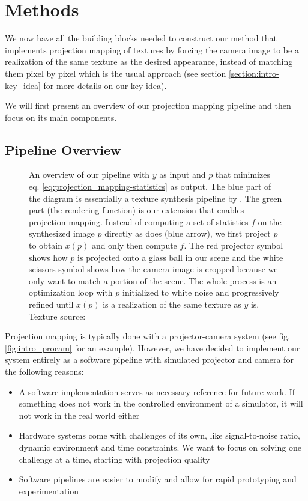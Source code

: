 \chapter{Methods}
\label{chapter:methods}

We now have all the building blocks needed to construct our method that implements projection mapping of textures by forcing the camera image to be a realization of the same texture as the desired appearance, instead of matching them pixel by pixel which is the usual approach (see section \ref{section:intro-key_idea} for more details on our key idea).

We will first present an overview of our projection mapping pipeline and then focus on its main components.

\section{Pipeline Overview}
\label{section:methods-pipeline_overview}

\begin{figure}[]
    \centering
    \def\svgwidth{\textwidth}
    
    \caption{An overview of our pipeline with \(y\) as input and \(p\) that minimizes eq. \ref{eq:projection_mapping-statistics} as output. The blue part of the diagram is essentially a texture synthesis pipeline by \citet{Gatys2015}. The green part (the rendering function) is our extension that enables projection mapping. Instead of computing a set of statistics \(f\) on the synthesized image \(p\) directly as \citet{Gatys2015} does (blue arrow), we first project \(p\) to obtain \(x(p)\) and only then compute \(f\). The red projector symbol shows how \(p\) is projected onto a glass ball in our scene and the white scissors symbol shows how the camera image is cropped because we only want to match a portion of the scene. The whole process is an optimization loop with \(p\) initialized to white noise and progressively refined until \(x(p)\) is a realization of the same texture as \(y\) is. Texture source: \citet{Pixar128}}
    \label{fig:methods_pipeline}
\end{figure}

Projection mapping is typically done with a projector-camera system (see fig. \ref{fig:intro_procam} for an example). However, we have decided to implement our system entirely as a software pipeline with simulated projector and camera for the following reasons:

\begin{itemize}
    \item A software implementation serves as necessary reference for future work. If something does not work in the controlled environment of a simulator, it will not work in the real world either
    \item Hardware systems come with challenges of its own, like signal-to-noise ratio, dynamic environment and time constraints. We want to focus on solving one challenge at a time, starting with projection quality
    \item Software pipelines are easier to modify and allow for rapid prototyping and experimentation
\end{itemize}

